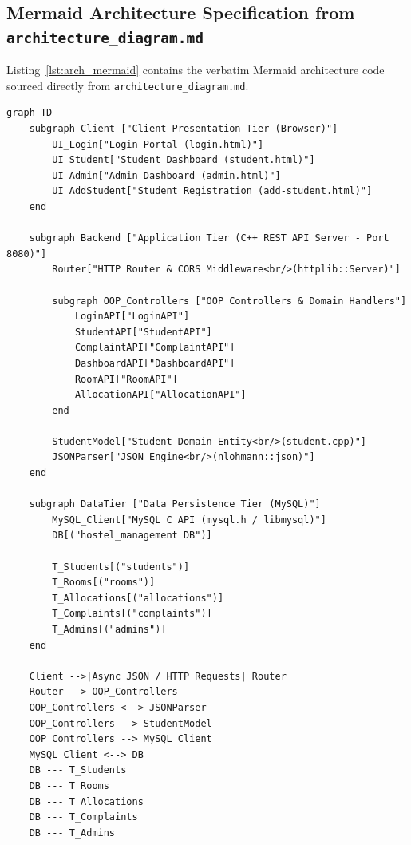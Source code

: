 \documentclass[12pt,a4paper]{article}
\begin{document}
\subsection{Mermaid Architecture Specification from \texttt{architecture\_diagram.md}}
\label{sec:arch_mermaid}
Listing~\ref{lst:arch_mermaid} contains the verbatim Mermaid architecture code sourced directly from \texttt{architecture\_diagram.md}.

\begin{lstlisting}[style=mermaidstyle, caption={Mermaid Architecture Code from \texttt{architecture\_diagram.md}}, label={lst:arch_mermaid}]
graph TD
    subgraph Client ["Client Presentation Tier (Browser)"]
        UI_Login["Login Portal (login.html)"]
        UI_Student["Student Dashboard (student.html)"]
        UI_Admin["Admin Dashboard (admin.html)"]
        UI_AddStudent["Student Registration (add-student.html)"]
    end

    subgraph Backend ["Application Tier (C++ REST API Server - Port 8080)"]
        Router["HTTP Router & CORS Middleware<br/>(httplib::Server)"]
        
        subgraph OOP_Controllers ["OOP Controllers & Domain Handlers"]
            LoginAPI["LoginAPI"]
            StudentAPI["StudentAPI"]
            ComplaintAPI["ComplaintAPI"]
            DashboardAPI["DashboardAPI"]
            RoomAPI["RoomAPI"]
            AllocationAPI["AllocationAPI"]
        end

        StudentModel["Student Domain Entity<br/>(student.cpp)"]
        JSONParser["JSON Engine<br/>(nlohmann::json)"]
    end

    subgraph DataTier ["Data Persistence Tier (MySQL)"]
        MySQL_Client["MySQL C API (mysql.h / libmysql)"]
        DB[("hostel_management DB")]
        
        T_Students[("students")]
        T_Rooms[("rooms")]
        T_Allocations[("allocations")]
        T_Complaints[("complaints")]
        T_Admins[("admins")]
    end

    Client -->|Async JSON / HTTP Requests| Router
    Router --> OOP_Controllers
    OOP_Controllers <--> JSONParser
    OOP_Controllers --> StudentModel
    OOP_Controllers --> MySQL_Client
    MySQL_Client <--> DB
    DB --- T_Students
    DB --- T_Rooms
    DB --- T_Allocations
    DB --- T_Complaints
    DB --- T_Admins
\end{lstlisting}

\end{document}
